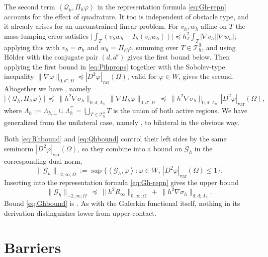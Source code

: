 \documentclass[12pt]{amsart}
\theoremstyle{definition}
\newcommand{\Om}{\Omega}
\newcommand{\Th}{\mathcal{T}_h}
\newcommand{\Ih}{I_h}
\newcommand{\Pih}{\Pi_h}
\newcommand{\Thzero}{\Th^0}
\newcommand{\Gh}{\mathcal{G}_h}
\newcommand{\Qh}{\mathcal{Q}_h}
\newcommand{\Lamh}{\Lambda_h}
\newcommand{\Lamhbot}{\Lambda_{h,\bot}}
\newcommand{\Lamhtop}{\Lambda_h^\top}
\begin{document}
The second term $\left<\Qh,\Pih\varphi\right>$ in the representation formula \eqref{eq:Gh-repn} accounts for the effect of quadrature.  It too is independent of obstacle type, and it already arises for an unconstrained linear problem.  For $v_h,w_h$ affine on $T$ the mass-lumping error satisfies $\bigl|\int_T (v_h w_h - \Ih(v_h w_h))\bigr| \preceq h_T^2 \int_T |\nabla v_h| |\nabla w_h|$; applying this with $v_h = \sigma_h$ and $w_h = \Pih\varphi$, summing over $T \in \Thzero$, and using H\"older with the conjugate pair $(d,d')$ gives the first bound below.  Then applying the first bound in \eqref{eq:Pihprops} together with the Sobolev-type inequality $\|\nabla\varphi\|_{0,d';\Om} \preceq |D^2\varphi|_{\mathrm{var}}(\Om)$, valid for $\varphi \in W$, gives the second.  Altogether we have \cite[formula (3.9)]{NSV03}, namely
\begin{equation}
\label{eq:Qhbound}
  \bigl|\left<\Qh,\Pih\varphi\right>\bigr| \ \preceq\ \|h^2\nabla\sigma_h\|_{0,d;\Lamh}\, \|\nabla\Pih\varphi\|_{0,d';\Om}
  \ \preceq\ \|h^2\nabla\sigma_h\|_{0,d;\Lamh}\, |D^2\varphi|_{\mathrm{var}}(\Om),
\end{equation}
where $\Lamh := \Lamhbot \cup \Lamhtop = \bigcup_{T\in\Thzero} T$ is the union of both active regions.  We have generalized from the unilateral case, namely \cite[formula (2.4)]{NSV03}, to bilateral in the obvious way.

Both \eqref{eq:Rhbound} and \eqref{eq:Qhbound} control their left sides by the same seminorm $|D^2\varphi|_{\mathrm{var}}(\Om)$, so they combine into a bound on $\Gh$ in the corresponding dual norm,
\begin{equation}
\label{eq:Ghdualnorm}
  \|\Gh\|_{-2,\infty;\Om} := \sup\bigl\{\left<\Gh,\varphi\right> : \varphi\in W,\ |D^2\varphi|_{\mathrm{var}}(\Om)\le 1\bigr\}.
\end{equation}
Inserting into the representation formula \eqref{eq:Gh-repn} gives the upper bound
\begin{equation}
\label{eq:Ghbound}
  \|\Gh\|_{-2,\infty;\Om} \ \preceq\ \|h^2 R_\infty\|_{0,\infty;\Om} \ +\ \|h^2\nabla\sigma_h\|_{0,d;\Lamh}.
\end{equation}
Bound \eqref{eq:Ghbound} is \cite[formula (3.10)]{NSV03}.  As with the Galerkin functional itself, nothing in its derivation distinguishes lower from upper contact.


\section{Barriers} \label{sec:barriers}
\end{document}
